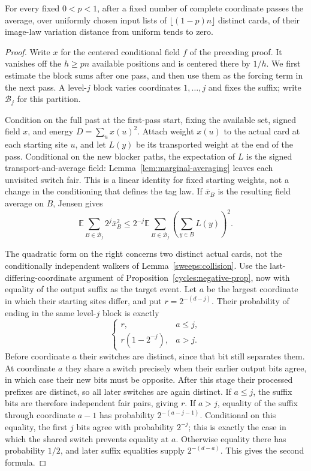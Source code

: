 \begin{proposition}
\label{lifts:transport-marginals}
For every fixed $0<p<1$, after a fixed number of complete coordinate
passes the average, over uniformly chosen input lists of
$\lfloor(1-p)n\rfloor$ distinct cards, of their image-law variation
distance from uniform tends to zero.
\end{proposition}
\begin{proof}
Write $x$ for the centered conditional field $f$ of the preceding
proof. It vanishes off the $h\ge pn$ available positions and is
centered there by $1/h$. We first estimate the block sums after one
pass, and then use them as the forcing term in the next pass.
A level-$j$ block varies coordinates $1,\ldots,j$ and fixes the suffix;
write $\mathcal B_j$ for this partition.

Condition on the full past at the first-pass start, fixing the available
set, signed field $x$, and energy $D=\sum_u x(u)^2$. Attach weight
$x(u)$ to the actual card at each starting site $u$, and let $L(y)$
be its transported weight at the end of the pass. Conditional on the
new blocker paths, the expectation of $L$ is the signed
transport-and-average field: Lemma~\ref{lem:marginal-averaging}
leaves each unvisited switch fair. This is a linear identity for fixed
starting weights, not a change in the conditioning that defines the
tag law. If $\bar x_B$ is the resulting field average on $B$, Jensen gives
\[
 \mathbb E\sum_{B\in\mathcal B_j}2^j\bar x_B^2
 \le 2^{-j}\mathbb E\sum_{B\in\mathcal B_j}
                       \left(\sum_{y\in B}L(y)\right)^2.
\]

The quadratic form on the right concerns two distinct actual cards,
not the conditionally independent walkers of
Lemma~\ref{sweeps:collision}. Use the last-differing-coordinate
argument of Proposition~\ref{cycles:negative-prop}, now with equality
of the output suffix as the target event. Let $a$ be the largest coordinate in
which their starting sites differ, and put $r=2^{-(d-j)}$. Their
probability of ending in the same level-$j$ block is exactly
\[
 \begin{cases}
 r,&a\le j,\\
 r(1-2^{-j}),&a>j.
 \end{cases}
\]
Before coordinate $a$ their switches are distinct, since that bit still
separates them. At coordinate $a$ they share a switch precisely when
their earlier output bits agree, in which case their new bits must be
opposite. After this stage their processed prefixes are distinct, so
all later switches are again distinct. If $a\le j$, the suffix bits
are therefore independent fair pairs, giving $r$. If $a>j$, equality
of the suffix through coordinate $a-1$ has probability
$2^{-(a-j-1)}$. Conditional on this equality, the first $j$ bits agree
with probability $2^{-j}$; this is exactly the case in which the shared
switch prevents equality at $a$. Otherwise equality there has probability
$1/2$, and later suffix equalities supply $2^{-(d-a)}$.
This gives the second formula.


\end{proof}
